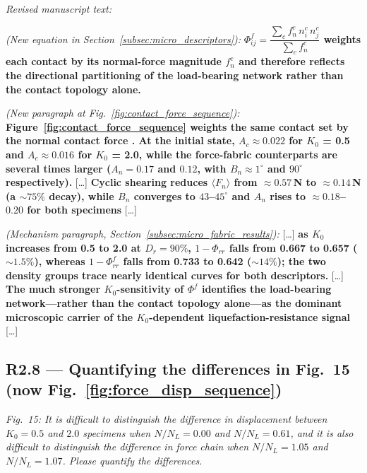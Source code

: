 \documentclass[11pt,a4paper]{article}
\newenvironment{rcomment}
  {\begin{leftbar}\color{black!75}\itshape}
  {\end{leftbar}\vspace{0.3em}}
\newenvironment{revtext}
  {\par\vspace{0.2em}\noindent\textit{Revised manuscript text:}\par
   \begingroup\color{black}\begin{leftbar}\small}
  {\end{leftbar}\endgroup\vspace{0.3em}}
\newcommand{\Kzero}{\ensuremath{K_0}}
\begin{document}
\begin{revtext}
\textit{(New equation in Section~\ref{subsec:micro_descriptors}):}
\textbf{$\Phi^f_{ij} = \dfrac{\sum_c f_n^c\, n_i^c\, n_j^c}{\sum_c f_n^c}$
weights each contact by its normal-force magnitude $f_n^c$ and
therefore reflects the directional partitioning of the load-bearing
network rather than the contact topology alone.}
\medskip

\textit{(New paragraph at
Fig.~\ref{fig:contact_force_sequence}):}
\textbf{Figure~\ref{fig:contact_force_sequence} weights the same
contact set by the normal contact force \citep{Zhou2022,Song2024}.
At the initial state, $A_c \approx 0.022$ for \Kzero{} = 0.5 and
$A_c \approx 0.016$ for \Kzero{} = 2.0, while the force-fabric
counterparts are several times larger ($A_n = 0.17$ and $0.12$, with
$B_n \approx 1^\circ$ and $90^\circ$ respectively).} [\ldots]
\textbf{Cyclic shearing reduces $\langle F_n \rangle$ from
$\approx 0.57$\,N to $\approx 0.14$\,N (a $\sim 75\%$ decay), while
$B_n$ converges to $43$--$45^\circ$ and $A_n$ rises to $\approx
0.18$--$0.20$ for both specimens} [\ldots]
\medskip

\textit{(Mechanism paragraph,
Section~\ref{subsec:micro_fabric_results}):} [\ldots]
\textbf{as \Kzero{} increases from 0.5 to 2.0 at $D_r = 90\%$,
$1-\Phi_{rr}$ falls from 0.667 to 0.657 (${\sim}1.5\%$), whereas
$1-\Phi^f_{rr}$ falls from 0.733 to 0.642 (${\sim}14\%$); the two
density groups trace nearly identical curves for both descriptors.}
[\ldots] \textbf{The much stronger \Kzero{}-sensitivity of $\Phi^f$
identifies the load-bearing network---rather than the contact
topology alone---as the dominant microscopic carrier of the
\Kzero{}-dependent liquefaction-resistance signal} [\ldots]
\end{revtext}

\subsection*{R2.8 --- Quantifying the differences in Fig.~15 (now Fig.~\ref{fig:force_disp_sequence})}

\begin{rcomment}
Fig.~15: It is difficult to distinguish the difference in displacement
between $\Kzero=0.5$ and $2.0$ specimens when $N/N_L=0.00$ and $N/N_L=0.61$,
and it is also difficult to distinguish the difference in force chain when
$N/N_L=1.05$ and $N/N_L=1.07$. Please quantify the differences.
\end{rcomment}
\end{document}
